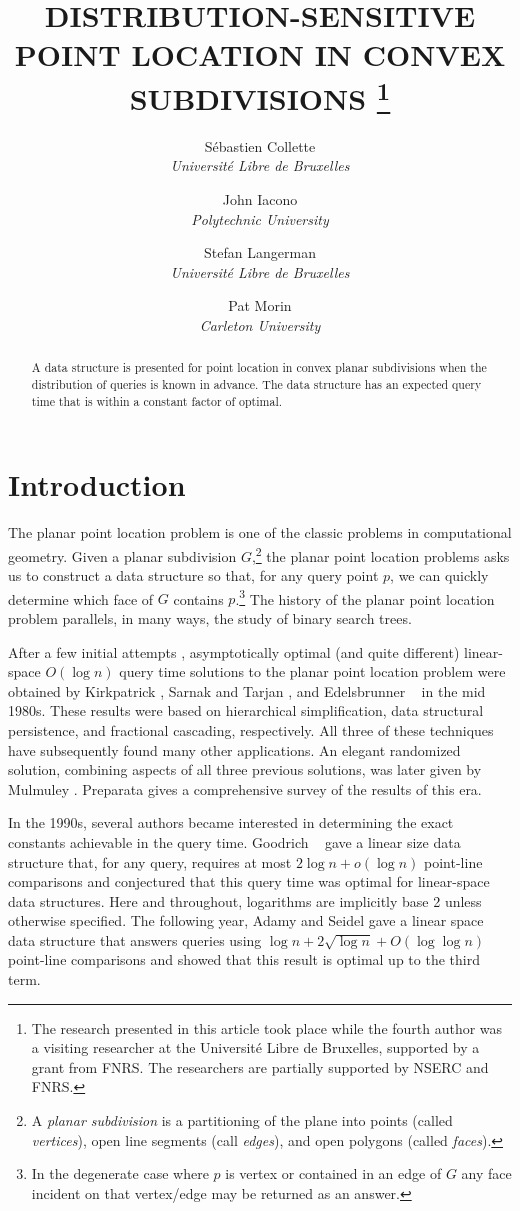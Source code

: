 \documentclass[charterfonts,lotsofwhite]{patmorin}
\title{\MakeUppercase{Distribution-Sensitive Point 
	Location in Convex Subdivisions}%
	\thanks{The research presented in this article took place
while the fourth author was a visiting researcher at the Universit\'e Libre de
Bruxelles, supported by a grant from FNRS.  The researchers are
partially supported by NSERC and FNRS.}}
\author{S\'ebastien Collette \\ \textit{Universit\'e Libre de Bruxelles}
  \and John Iacono \\ \textit{Polytechnic University}
  \and Stefan Langerman \\ \textit{Universit\'e Libre de Bruxelles}
  \and Pat Morin \\ \textit{Carleton University}}
\date{}
\begin{document}
\maketitle

\begin{abstract}
A data structure is presented for point location in convex planar
subdivisions when the distribution of queries is known in advance.
The data structure has an expected query time that is within a
constant factor of optimal.
\end{abstract}


\section{Introduction}

The planar point location problem is one of the classic problems in
computational geometry. Given a planar subdivision $G$,\footnote{A
\emph{planar subdivision} is a partitioning of the plane into points
(called \emph{vertices}), open line segments (call \emph{edges}), and
open polygons (called \emph{faces}).} the planar point location
problems asks us to construct a data structure so that, for any query
point $p$, we can quickly determine which face of $G$ contains
$p$.\footnote{In the degenerate case where $p$ is vertex or contained
in an edge of $G$ any face incident on that vertex/edge may be
returned as an answer.} The history of the planar point location
problem parallels, in many ways, the study of binary search trees.

After a few initial attempts \cite{dl76,lp77,p81}, asymptotically
optimal (and quite different) linear-space $O(\log n)$ query time
solutions to the planar point location problem were obtained by
Kirkpatrick \cite{k83}, Sarnak and Tarjan \cite{st86}, and
Edelsbrunner \etal\ \cite{egs86} in the mid 1980s.  These results were
based on hierarchical simplification, data structural persistence, and
fractional cascading, respectively.  All three of these techniques have
subsequently found many other applications.  An elegant randomized
solution, combining aspects of all three previous solutions, was later
given by Mulmuley \cite{m90}.  Preparata \cite{p90} gives a
comprehensive survey of the results of this era.

In the 1990s, several authors became interested in determining the
exact constants achievable in the query time.  Goodrich \etal\
\cite{gor97} gave a linear size data structure that, for any query,
requires at most $2\log n + o(\log n)$ point-line comparisons and
conjectured that this query time was optimal for linear-space data
structures. Here and throughout, logarithms are implicitly base 2
unless otherwise specified. The following year, Adamy and Seidel
\cite{as98} gave a linear space data structure that answers queries
using $\log n + 2\sqrt{\log n} + O(\log\log n)$ point-line comparisons
and showed that this result is optimal up to the third term.
\end{document}
